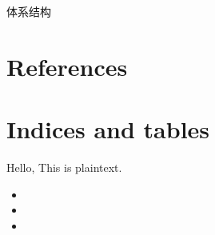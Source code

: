 \documentclass[letterpaper,10pt,english]{sphinxmanual}
\begin{document}
\sphinxAtStartPar
体系结构


\chapter{References}
\label{\detokenize{lab1:references}}

\chapter{Indices and tables}
\label{\detokenize{index:indices-and-tables}}
\sphinxAtStartPar
Hello, This is plaintext.

\noindent{}
\begin{itemize}
\item {} 
\sphinxAtStartPar
{}

\item {} 
\sphinxAtStartPar
{}

\item {} 
\sphinxAtStartPar
{}

\end{itemize}



\renewcommand{\indexname}{Index}
\printindex
\end{document}
